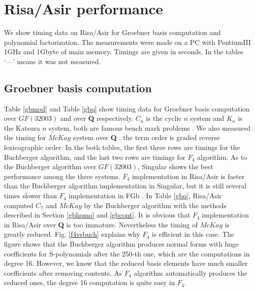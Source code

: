 \documentclass[runningheads]{cl2emult}
\begin{document}

\section{Risa/Asir performance}

We show timing data on Risa/Asir for Groebner basis computation
and polynomial factorization. The measurements were made on
a PC with PentiumIII 1GHz and 1Gbyte of main memory. Timings
are given in seconds. In the tables `---' means it was not
measured.

\subsection{Groebner basis computation}

Table \ref{gbmod} and Table \ref{gbq} show timing data for Groebner
basis computation over $GF(32003)$ and over {\bf Q} respectively.
$C_n$ is the cyclic $n$ system and $K_n$ is the Katsura $n$ system,
both are famous bench mark problems \cite{BENCH}.  We also measured
the timing for $McKay$ system over {\bf Q} \cite{REPL}.  the term
order is graded reverse lexicographic order.  In the both tables, the
first three rows are timings for the Buchberger algorithm, and the
last two rows are timings for $F_4$ algorithm. As to the Buchberger
algorithm over $GF(32003)$, Singular\cite{SINGULAR} shows the best
performance among the three systems. $F_4$ implementation in Risa/Asir
is faster than the Buchberger algorithm implementation in Singular,
but it is still several times slower than $F_4$ implementation in FGb
\cite{FGB}.  In Table \ref{gbq}, Risa/Asir computed $C_7$ and $McKay$
by the Buchberger algorithm with the methods described in Section
\ref{gbhomo} and \ref{gbcont}.  It is obvious that $F_4$
implementation in Risa/Asir over {\bf Q} is too immature. Nevertheless
the timing of $McKay$ is greatly reduced.  Fig. \ref{f4vsbuch}
explains why $F_4$ is efficient in this case.  The figure shows that
the Buchberger algorithm produces normal forms with huge coefficients
for S-polynomials after the 250-th one, which are the computations in
degree 16.  However, we know that the reduced basis elements have much
smaller coefficients after removing contents.  As $F_4$ algorithm
automatically produces the reduced ones, the degree 16 computation is
quite easy in $F_4$.
\end{document}
